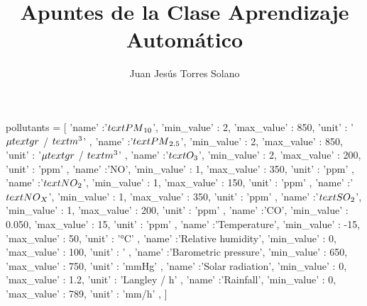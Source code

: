 \documentclass{article}
\title{Apuntes de la Clase Aprendizaje Automático}
\author{Juan Jesús Torres Solano}
\theoremstyle{mytheoremstyle}
\theoremstyle{mytheoremstyle}
\theoremstyle{myproblemstyle}
\begin{document}
    \maketitle


    pollutants = [
        {
            'name' :'$\\text{PM}_{10}$',
            'min_value' : 2,
            'max_value' : 850,
            'unit' : '$\mu\\text{gr}$ / $\\text{m}^3$'
        },
        {
            'name' :'$\\text{PM}_{2.5}$',
            'min_value' : 2,
            'max_value' : 850,
            'unit' : '$\mu\\text{gr}$ / $\\text{m}^3$'
        },
        {
            'name' :'$\\text{O}_3$',
            'min_value' : 2,
            'max_value' : 200,
            'unit' : 'ppm'
        },
        {
            'name' :'NO',
            'min_value' : 1,
            'max_value' : 350,
            'unit' : 'ppm'
        },
        {
            'name' :'$\\text{NO}_2$',
            'min_value' : 1,
            'max_value' : 150,
            'unit' : 'ppm'
        },
        {
            'name' :'$\\text{NO}_X$',
            'min_value' : 1,
            'max_value' : 350,
            'unit' : 'ppm'
        },
        {
            'name' :'$\\text{SO}_2$',
            'min_value' : 1,
            'max_value' : 200,
            'unit' : 'ppm'
        },
        {
            'name' :'CO',
            'min_value' : 0.050,
            'max_value' : 15,
            'unit' : 'ppm'
        },
        {
            'name' :'Temperature',
            'min_value' : -15,
            'max_value' : 50,
            'unit' : '°C'
        },
        {
            'name' :'Relative humidity',
            'min_value' : 0,
            'max_value' : 100,
            'unit' : '%
        },
        {
            'name' :'Barometric pressure',
            'min_value' : 650,
            'max_value' : 750,
            'unit' : 'mmHg'
        },
        {
            'name' :'Solar radiation',
            'min_value' : 0,
            'max_value' : 1.2,
            'unit' : 'Langley / h'
        },
        {
            'name' :'Rainfall',
            'min_value' : 0,
            'max_value' : 789,
            'unit' : 'mm/h'
        },
    ]

    
\end{document}
